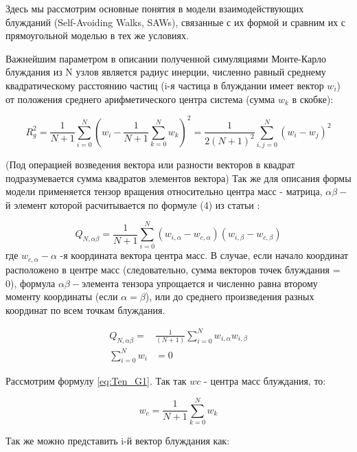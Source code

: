Здесь мы рассмотрим основные понятия в модели взаимодействующих блужданий (Self-Avoiding Walks, SAWs), связанные с их формой и сравним их с прямоугольной моделью в тех же условиях. 

Важнейшим параметром в описании полученной симуляциями Монте-Карло блуждания из N узлов является радиус инерции, численно равный среднему квадратическому расстоянию частиц (i-я частица в блуждании имеет вектор $w_{i}$) от положения среднего арифметического центра система (сумма $w_{k}$ в скобке)\cite{caracciolo2011geometrical}:

\begin{equation}\label{eq:Rg}
    R^{2}_{g} = \frac{1}{N+1} \sum^{N}_{i=0}\left(w_{i} - \frac{1}{N+1}\sum^{N}_{k=0}w_{k}\right)^2 = \frac{1}{2(N+1)^{2}}\sum^{N}_{i,j=0}(w_{i} - w_{j})^{2}
\end{equation}

(Под операцией возведения вектора или разности векторов в квадрат подразумевается сумма квадратов элементов вектора) Так же для описания формы модели применяется тензор вращения относительно центра масс - матрица, $\alpha\beta-$й элемент которой расчитывается по формуле (4) из статьи\cite{arkin2013gyration} :

\begin{equation}\label{eq:Ten_G1}
    Q_{N,\alpha\beta} = \frac{1}{N+1} \sum^{N}_{i=0}(w_{i,\alpha} - w_{c, \alpha})(w_{i,\beta} - w_{c, \beta})
\end{equation}
где $w_{c,\alpha} - \alpha$ -я координата вектора центра масс. В случае, если начало координат расположено в центре масс (следовательно, сумма векторов точек блуждания = 0), формула $\alpha\beta-$элемента тензора упрощается и численно равна второму моменту координаты (если $\alpha = \beta$), или до среднего произведения разных координат по всем точкам блуждания.


\begin{align}\label{eq:Ten_G_C}
    Q_{N,\alpha\beta} = &\frac{1}{(N+1)} \sum_{i=0}^{N} w_{i, \alpha} w_{i, \beta} \\
    \sum^{N}_{i=0}w_{i} &= 0
\end{align}

Рассмотрим формулу \eqref{eq:Ten_G1}. Так так $w{c}$ - центра масс блуждания, то:

\begin{equation}
    w_{c} = \frac{1}{N+1} \sum_{k=0}^{N} w_{k}
\end{equation}

Так же можно представить i-й вектор блуждания как:

